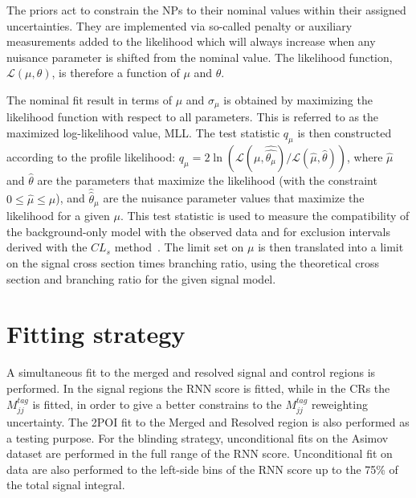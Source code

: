 The priors act to constrain the NPs to their nominal values within their assigned uncertainties.
They are implemented via so-called penalty or auxiliary measurements added to the likelihood which will always increase when any nuisance parameter is shifted from the nominal value.
The likelihood function, $\mathcal{L} (\mu,\theta)$, is therefore a function of $\mu$ and $\theta$.

The nominal fit result in terms of $\mu$ and $\sigma_{\mu}$ is obtained by maximizing the likelihood function with respect to all parameters.
This is referred to as the maximized log-likelihood value, MLL.
The test statistic $q_\mu$ is then constructed according to the profile likelihood: $q_\mu = 2 \ln (\mathcal{L} (\mu, \hat{\hat{\theta_\mu}})/\mathcal{L} (\hat{\mu}, \hat{\theta}))$, where $\hat{\mu}$ and $\hat{\theta}$ are the parameters that maximize the likelihood (with the constraint $0 \leq \hat{\mu} \leq \mu$), and $\hat{\hat{\theta}}_\mu$ are the nuisance parameter values that maximize the likelihood for a given $\mu$.
This test statistic is used to measure the compatibility of the background-only model with the observed data and for exclusion intervals derived with the $CL_s$ method~\cite{Cowan:2010js}.
The limit set on $\mu$ is then translated into a limit on the signal cross section times branching ratio, using the theoretical cross section and branching ratio for the given signal model.

\section{Fitting strategy}
A simultaneous fit to the merged and resolved signal and control regions is performed. In the signal regions the RNN score is fitted, while in the CRs the $M^{tag}_{jj}$ is fitted, in order to give a better constrains to the $M^{tag}_{jj}$ reweighting uncertainty. The 2POI fit to the Merged and Resolved region is also performed as a testing purpose. For the blinding strategy, unconditional fits on the Asimov dataset are performed in the full range of the RNN score. Unconditional fit on data are also performed to the left-side bins of the RNN score up to the 75\% of the total signal integral.



